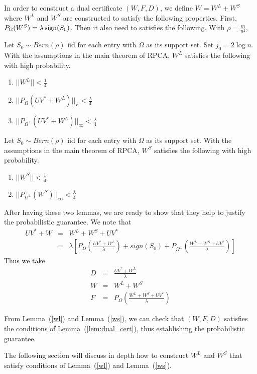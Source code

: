 In order to construct a dual certificate $(W, F, D)$, we define $W = W^{L}+W^{S}$ where $W^{L}$ and $W^{S}$ are constructed to satisfy the following
properties. First, $P_{\Omega}(W^{S}) = \lambda \operatorname{sign}(S_0)$. Then it also need to satisfies the following. With $\rho = \frac{m}{n^2}$,

\begin{lemma} \label{wl} Let $S_0\sim Bern(\rho)$ iid for each entry with $\Omega$
as its support set. Set $j_{0}=2\log n$. With the assumptions in
the main theorem of RPCA, $W^{L}$ satisfies the following with high
probability.
\begin{enumerate}
\item $||W^{L}||<\frac{1}{4}$
\item $||P_{\Omega}(UV^{*}+W^{L})||_{F}<\frac{\lambda}{4}$
\item $||P_{\Omega^{\bot}}(UV^{*}+W^{L})||_{\infty}<\frac{\lambda}{4}$
\end{enumerate}
\end{lemma}

\begin{lemma} \label{ws} Let $S_0\sim Bern(\rho)$ iid for each entry with $\Omega$
as its support set. With the assumptions in the main theorem of RPCA,
$W^{S}$ satisfies the following with high probability.
\begin{enumerate}
\item $||W^{S}||<\frac{1}{4}$
\item $||P_{\Omega^{\bot}}(W^{S})||_{\infty}<\frac{\lambda}{4}$
\end{enumerate}
\end{lemma}

After having these two lemmas, we are ready to show that they help to justify the probabilistic guarantee. We note that
\begin{eqnarray*}
UV^{*}+W & = & W^{L}+W^{S}+UV^{*}\\
 & = & \lambda \left[ P_{\Omega} \left( \frac{UV^{*}+W^{L}}{\lambda} \right) + sign(S_{0}) + P_{\Omega^{\bot}} \left( \frac{W^{L}+W^{S}+UV^{*}}{\lambda} \right) \right]
\end{eqnarray*}
Thus we take
\begin{eqnarray*}
D & = & \frac{UV^{*}+W^{L}}{\lambda}\\
W & = & W^{L}+W^{S}\\
F & = & P_{\Omega} \left( \frac{W^{L}+W^{S}+UV^{*}}{\lambda} \right)
\end{eqnarray*}


From Lemma~(\ref{wl}) and Lemma~(\ref{ws}), we can check that $(W,F,D)$ satisfies the conditions of Lemma~(\ref{lem:dual_cert}), thus establishing the probabilistic guarantee.

The following section will discuss in depth how to construct $W^{L}$ and $W^{S}$ that satisfy conditions of Lemma~(\ref{wl}) and Lemma~(\ref{ws}). 